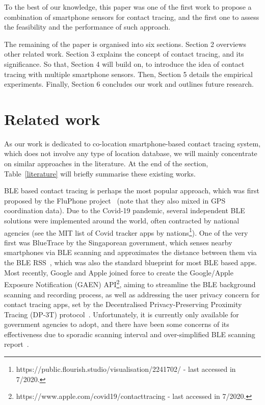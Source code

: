 \documentclass[graybox]{svmult}
\begin{document}
To the best of our knowledge, this paper was one of the first work to propose a combination of smartphone sensors for contact tracing, and the first one to assess the feasibility and the performance of such approach.

The remaining of the paper is organised into six sections. Section 2 overviews other related work. Section 3 explains the concept of contact tracing, and its significance. So that, Section 4 will build on, to introduce the idea of contact tracing with multiple smartphone sensors. Then, Section 5 details the empirical experiments. Finally, Section 6 concludes our work and outlines future research.


\section{Related work}
As our work is dedicated to co-location smartphone-based contact tracing system, which does not involve any type of location database, we will mainly concentrate on similar approaches in the literature. At the end of the section, Table~\ref{literature} will briefly summarise these existing works.

BLE based contact tracing is perhaps the most popular approach, which was first proposed by the FluPhone project~\cite{yoneki2011fluphone} (note that they also mixed in GPS coordination data). Due to the Covid-19 pandemic, several independent BLE solutions were implemented around the world, often contracted by national agencies (see the MIT list of Covid tracker apps by nations\footnote{https://public.flourish.studio/visualisation/2241702/ - last accessed in 7/2020.}). One of the very first was BlueTrace by the Singaporean government, which senses nearby smartphones via BLE scanning and approximates the distance between them via the BLE RSS~\cite{bay2020bluetrace}, which was also the standard blueprint for most BLE based apps. Most recently, Google and Apple joined force to create the Google/Apple Exposure Notification (GAEN) API\footnote{https://www.apple.com/covid19/contacttracing - last accessed in 7/2020.}, aiming to streamline the BLE background scanning and recording process, as well as addressing the user privacy concern for contact tracing apps, set by the Decentralised Privacy-Preserving Proximity Tracing (DP-3T) protocol~\cite{hubaux2020decentralized}. Unfortunately, it is currently only available for government agencies to adopt, and there have been some concerns of its effectiveness due to sporadic scanning interval and over-simplified BLE scanning report~\cite{dehaye2020swisscovid,leith2020gaen}.
\end{document}
